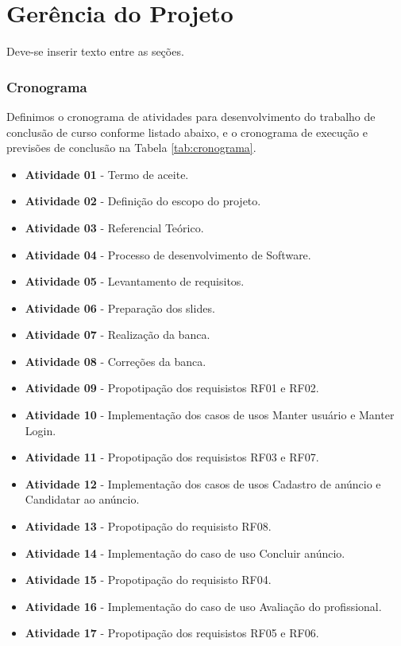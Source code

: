 \chapter{Gerência do Projeto}\label{cap:desenvolvimento}
Deve-se inserir texto entre as seções.
\subsection{Cronograma}

Definimos o cronograma de atividades para desenvolvimento do trabalho de conclusão de curso conforme listado abaixo, e o cronograma de execução e previsões de conclusão na Tabela \ref{tab:cronograma}.

\begin{itemize}
    \item \textbf{Atividade 01} - Termo de aceite.
    \item \textbf{Atividade 02} - Definição do escopo do projeto.
    \item \textbf{Atividade 03} - Referencial Teórico.
    \item \textbf{Atividade 04} - Processo de desenvolvimento de Software.
    \item \textbf{Atividade 05} - Levantamento de requisitos.
    \item \textbf{Atividade 06} - Preparação dos slides.
    \item \textbf{Atividade 07} - Realização da banca.
    \item \textbf{Atividade 08} - Correções da banca.
    \item \textbf{Atividade 09} - Propotipação dos requisistos RF01 e RF02.
    \item \textbf{Atividade 10} - Implementação dos casos de usos Manter usuário e Manter Login.
    \item \textbf{Atividade 11} - Propotipação dos requisistos RF03 e RF07.
    \item \textbf{Atividade 12} - Implementação dos casos de usos Cadastro de anúncio e Candidatar ao anúncio.
    \item \textbf{Atividade 13} - Propotipação do requisisto RF08.
    \item \textbf{Atividade 14} - Implementação do caso de uso Concluir anúncio.
    \item \textbf{Atividade 15} - Propotipação do requisisto RF04.
    \item \textbf{Atividade 16} - Implementação do caso de uso Avaliação do profissional.
    \item \textbf{Atividade 17} - Propotipação dos requisistos RF05 e RF06.
\end{itemize}

